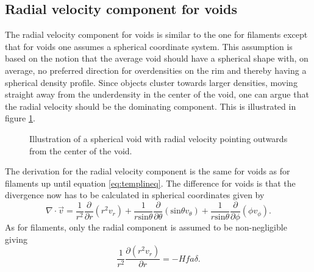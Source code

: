 \subsection{Radial velocity component for voids}
The radial velocity component for voids is similar to the one for filaments
except that for voids one assumes a spherical coordinate system. This assumption
is based on the notion that the average void should have a spherical shape with,
on average, no preferred direction for overdensities on the rim and
thereby having a spherical density profile. Since objects cluster towards larger
densities, moving straight away from the
underdensity in the center of the void, one can argue that the radial velocity
should be the dominating component. This is illustrated in figure \ref{fig:voidvr}.
\begin{figure}
    \begin{center}
    \end{center}
    \caption{Illustration of a spherical void with radial velocity pointing outwards from the center of the void.}
    \label{fig:voidvr}
\end{figure}
The derivation for the radial velocity component is the same for voids as for
filaments up until equation \ref{eq:templineq}. The difference for voids is that
the divergence now has to be calculated in spherical coordinates given by
\begin{equation}
    \nabla\cdot \vec{v}=\frac{1}{r^2}\frac{\partial}{\partial r}(r^2v_r)
                       +\frac{1}{r\mathrm{sin}\theta}\frac{\partial}{\partial \theta}(\mathrm{sin}\theta v_\theta)
                       +\frac{1}{r\mathrm{sin}\theta}\frac{\partial}{\partial \phi}(\phi v_\phi).
\end{equation}
As for filaments, only the radial component is assumed to be non-negligible
giving
\begin{equation}
    \frac{1}{r^2}\frac{\partial(r^2v_r)}{\partial r}=-Hfa\delta.
\end{equation}

